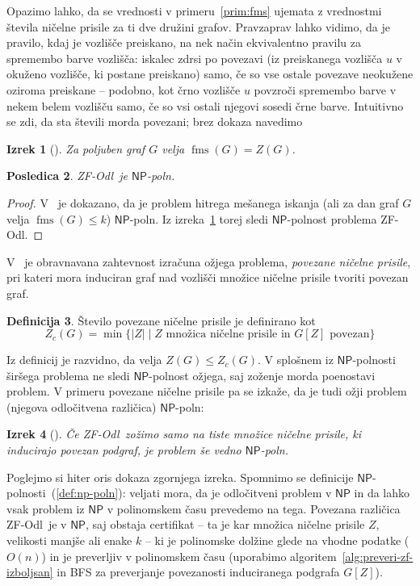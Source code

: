 \documentclass[12pt,a4paper,twoside]{article}
\theoremstyle{definition} %
\newtheorem{definicija}{Definicija}[section]
\theoremstyle{plain} %
\newtheorem{izrek}[definicija]{Izrek}
\newtheorem{posledica}[definicija]{Posledica}
\numberwithin{equation}{section}  %
\newcommand{\NP}{\ensuremath{\mathsf{NP}}}
\newcommand{\ZFOdl}{\textsf{ZF-Odl}}
\DeclareMathOperator{\fms}{fms}
\begin{document}
Opazimo lahko, da se vrednosti v primeru~\ref{prim:fms} ujemata z vrednostmi števila ničelne prisile za ti dve družini grafov. Pravzaprav lahko vidimo, da je pravilo, kdaj je vozlišče preiskano, na nek način ekvivalentno pravilu za spremembo barve vozlišča: iskalec zdrsi po povezavi (iz preiskanega vozlišča $u$ v okuženo vozlišče, ki postane preiskano) samo, če so vse ostale povezave neokužene oziroma preiskane -- podobno, kot črno vozlišče $u$ povzroči spremembo barve v nekem belem vozlišču samo, če so vsi ostali njegovi sosedi črne barve. Intuitivno se zdi, da sta števili morda povezani; brez dokaza navedimo
\begin{izrek}[{\cite[izrek 3.1]{fallat2016complexity}}]
    \label{izr:fms-je-zfs}
    Za poljuben graf $G$ velja $\fms{(G) = Z(G)}$.
\end{izrek}
\begin{posledica}
    \ZFOdl\ je $\NP$-poln.
\end{posledica}
\begin{proof}
     V~\cite{yang2013fast} je dokazano, da je problem hitrega mešanega iskanja (ali za dan graf $G$ velja $\fms{(G)} \leq k$) $\NP$-poln. Iz izreka~\ref{izr:fms-je-zfs} torej sledi $\NP$-polnost problema \ZFOdl.
\end{proof}

V~\cite{brimkov2017complexity} je obravnavana zahtevnost izračuna ožjega problema, \emph{povezane ničelne prisile}, pri kateri mora induciran graf nad vozlišči množice ničelne prisile tvoriti povezan graf.
\begin{definicija}
    Število povezane ničelne prisile je definirano kot
    \[ Z_c(G) = \min\{|Z| \mid Z \text{ množica ničelne prisile in } G[Z] \text{ povezan} \} \]
\end{definicija}
Iz definicij je razvidno, da velja $Z(G) \leq Z_c(G)$. V splošnem iz $\NP$-polnosti širšega problema ne sledi $\NP$-polnost ožjega, saj zoženje morda poenostavi problem. V primeru povezane ničelne prisile pa se izkaže, da je tudi ožji problem (njegova odločitvena različica) $\NP$-poln:
\begin{izrek}[{\cite[izrek 3]{brimkov2017complexity}}]
    Če \ZFOdl\ zožimo samo na tiste množice ničelne prisile, ki inducirajo povezan podgraf, je problem še vedno $\NP$-poln.
\end{izrek}
Poglejmo si hiter oris dokaza zgornjega izreka. Spomnimo se definicije $\NP$-polnosti~(\ref{def:np-poln}): veljati mora, da je odločitveni problem v $\NP$ in da lahko vsak problem iz $\NP$ v polinomskem času prevedemo na tega. Povezana različica \ZFOdl\ je v $\NP$, saj obstaja certifikat -- ta je kar množica ničelne prisile $Z$, velikosti manjše ali enake $k$ -- ki je polinomske dolžine glede na vhodne podatke ($O(n)$) in je preverljiv v polinomskem času (uporabimo algoritem~\ref{alg:preveri-zf-izboljsan} in BFS za preverjanje povezanosti induciranega podgrafa $G[Z]$).
\end{document}
